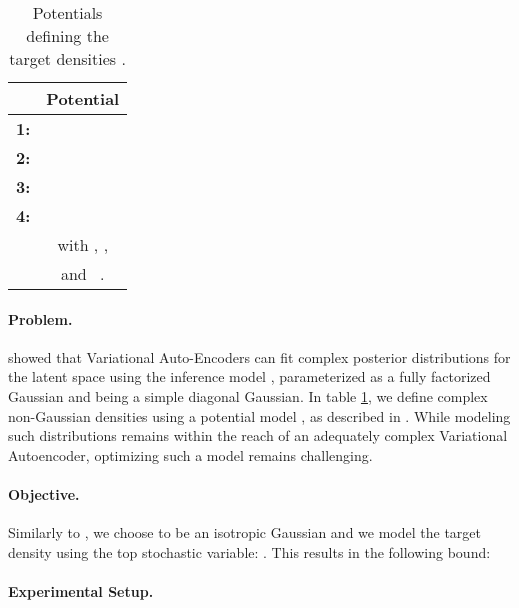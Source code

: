\documentclass{article}
\begin{document}
\begin{table}[h!]
\renewcommand\figurename{Table}
\begin{center}
\begin{small}
\begin{sc}
\begin{tabular}{l c}
& Potential  \\
\hline
\textbf{1:} &    \\
\textbf{2:} &   \\
\textbf{3:} &   \\
\textbf{4:} &   \\
\hline
& with , , \\
&  and  \ . \\
\hline
\end{tabular}
\end{sc}
\end{small}
\end{center}

\caption{Potentials defining the target densities .}\label{tab:target_densities}
\end{table}

\paragraph{Problem.} 

\cite{Maaloe2016} showed that Variational Auto-Encoders can fit complex posterior
distributions for the latent space using the inference model , parameterized as a fully factorized Gaussian and  being a simple diagonal Gaussian. In table \ref{tab:target_densities}, we define complex non-Gaussian densities using a potential model , as described in \cite{Rezende2015}. While modeling such distributions remains within the reach of an adequately complex Variational Autoencoder, optimizing such a model remains challenging.

\paragraph{Objective.} 

Similarly to \cite{Maaloe2016}, we choose  to be an isotropic Gaussian and we model the target density using the top stochastic variable: . This results in the following bound:



\paragraph{Experimental Setup.}
\end{document}
